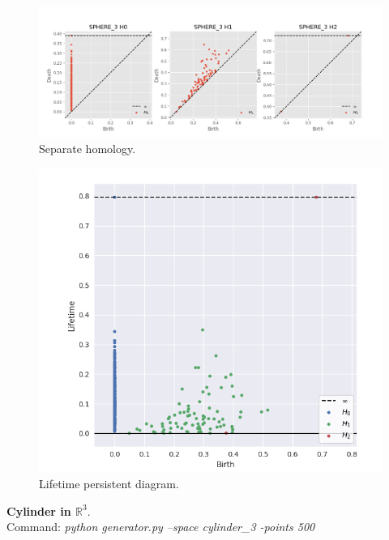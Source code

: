 \documentclass[11pt,a4paper]{report}
\begin{document}
              \begin{figure}[H]
                \centering
                \includegraphics[width=\linewidth]{./ripser/on_sphere_sep_homology.PNG}
                \caption{Separate homology.}
                \label{fig:sep hom}
              \end{figure}

              \begin{figure}[H]
                \centering
                \includegraphics[width=0.5\linewidth, scale=0.5]{./ripser/on_sphere_lifetime.PNG}
                \caption{Lifetime persistent diagram.}
                \label{fig:sep hom}
              \end{figure}

              \textbf{Cylinder in $\mathbb{R}^3$}.\\
              Command: \textit{python generator.py --space cylinder\_3 -points 500}
\end{document}
